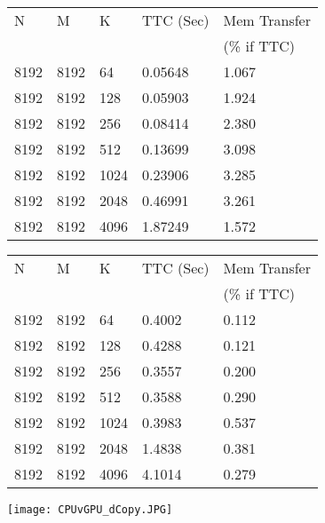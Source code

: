 \documentclass[14pt,fleqn]{article}
\begin{document}
\begin{table}
\begin{subtable}[l]{0.48\textwidth}
\begin{tabular}{|l|l|l|l|l|}                                  
    \hline\hline
    N  & M & K & TTC (Sec) & Mem Transfer\\
       &   &   &           & (\% if TTC) \\
    \hline\hline
    8192 & 8192 & 64 & 0.05648 & 1.067\\ \hline
    8192 & 8192 & 128 & 0.05903 & 1.924\\ \hline
    8192 & 8192 & 256 & 0.08414 & 2.380\\ \hline
    8192 & 8192 & 512 & 0.13699 & 3.098\\ \hline
    8192 & 8192 & 1024 & 0.23906 & 3.285\\ \hline
    8192 & 8192 & 2048 & 0.46991 & 3.261\\ \hline
    8192 & 8192 & 4096 & 1.87249 & 1.572\\ \hline

\end{tabular} 
\end{subtable}
\begin{subtable}[l]{0.48\textwidth}
\begin{tabular}{|l|l|l|l|l|}                                   
    \hline\hline         
    N  & M & K & TTC (Sec) & Mem Transfer\\
       &   &   &           & (\% if TTC) \\
    \hline\hline
    8192 & 8192 & 64 & 0.4002 & 0.112\\ \hline
    8192 & 8192 & 128 & 0.4288 & 0.121\\ \hline
    8192 & 8192 & 256 & 0.3557 & 0.200\\ \hline
    8192 & 8192 & 512 & 0.3588 & 0.290\\ \hline
    8192 & 8192 & 1024 & 0.3983 & 0.537\\ \hline
    8192 & 8192 & 2048 & 1.4838 & 0.381\\ \hline
    8192 & 8192 & 4096 & 4.1014 & 0.279\\ \hline

\end{tabular}
\end{subtable}
\end{table}


\begin{center}
\texttt{[image: CPUvGPU\_dCopy.JPG]}
\end{center}


\end{document}
